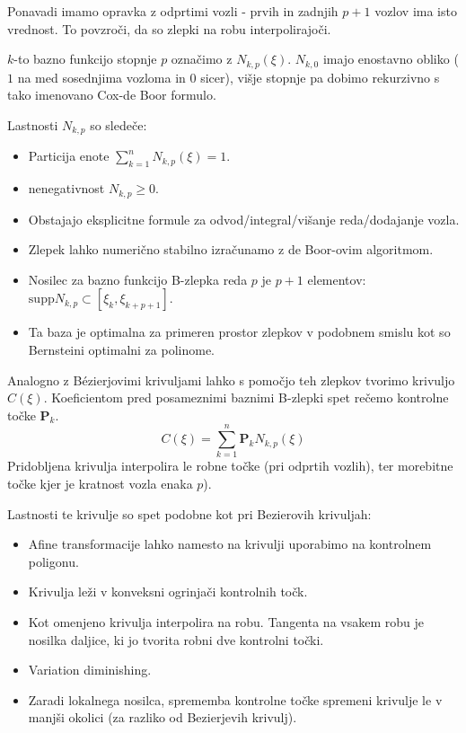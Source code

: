\documentclass{article}
\begin{document}
Ponavadi imamo opravka z odprtimi vozli - prvih in zadnjih $p+1$ vozlov ima isto vrednost. To povzroči, da so zlepki na robu interpolirajoči.

$k$-to bazno funkcijo stopnje $p$ označimo z $N_{k,p}(\xi)$. $N_{k,0}$ imajo enostavno obliko ($1$ na med sosednjima vozloma in $0$ sicer), višje stopnje pa dobimo rekurzivno s tako imenovano Cox-de Boor formulo.

Lastnosti $N_{k,p}$ so sledeče:
\begin{itemize}
\item Particija enote $\sum_{k=1}^n N_{k,p}(\xi) = 1$.
\item nenegativnost $N_{k,p} \geq 0$.
\item Obstajajo eksplicitne formule za odvod/integral/višanje reda/dodajanje vozla.
\item Zlepek lahko numerično stabilno izračunamo z de Boor-ovim algoritmom.
\item Nosilec za bazno funkcijo B-zlepka reda $p$ je $p+1$ elementov: $\mathrm{supp} N_{k,p} \subset [\xi_k,\xi_{k+p+1}]$.
\item Ta baza je optimalna za primeren prostor zlepkov v podobnem smislu kot so Bernsteini optimalni za polinome.
\end{itemize}


Analogno z Bézierjovimi krivuljami lahko s pomočjo teh zlepkov tvorimo krivuljo $C(\xi)$. Koeficientom pred posameznimi baznimi B-zlepki spet rečemo kontrolne točke $\textbf{P}_k$.
\begin{equation}
 C(\xi) = \sum_{k=1}^n \textbf{P}_k N_{k,p}(\xi)
\end{equation}
Pridobljena krivulja interpolira le robne točke (pri odprtih vozlih), ter morebitne točke kjer je kratnost vozla enaka $p$). 

Lastnosti te krivulje so spet podobne kot pri Bezierovih krivuljah:
\begin{itemize}
\item Afine transformacije lahko namesto na krivulji uporabimo na kontrolnem poligonu.
\item Krivulja leži v konveksni ogrinjači kontrolnih točk.
\item Kot omenjeno krivulja interpolira na robu. Tangenta na vsakem robu je nosilka daljice, ki jo tvorita robni dve kontrolni točki.
\item Variation diminishing.
\item Zaradi lokalnega nosilca, sprememba kontrolne točke spremeni krivulje le v manjši okolici (za razliko od Bezierjevih krivulj).
\end{itemize}
\end{document}
